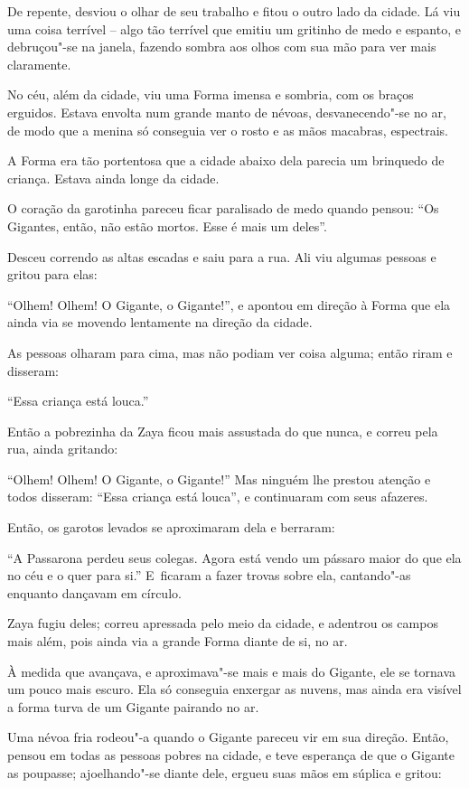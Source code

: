 De repente, desviou o olhar de seu trabalho e fitou o outro lado da
cidade. Lá viu uma coisa terrível -- algo tão terrível que emitiu um
gritinho de medo e espanto, e debruçou"-se na janela, fazendo sombra aos
olhos com sua mão para ver mais claramente.

No céu, além da cidade, viu uma Forma imensa e sombria, com os braços
erguidos. Estava envolta num grande manto de névoas,
desvanecendo"-se no ar, de modo que a menina só conseguia ver o rosto e as
mãos macabras, espectrais.

A Forma era tão portentosa que a cidade abaixo dela parecia um brinquedo
de criança. Estava ainda longe da cidade.

O coração da garotinha pareceu ficar paralisado de medo quando pensou:
``Os Gigantes, então, não estão mortos. Esse é mais um deles''.

Desceu correndo as altas escadas e saiu para a rua. Ali
viu algumas pessoas e gritou para elas:

``Olhem! Olhem! O Gigante, o Gigante!'', e apontou em direção à Forma
que ela ainda via se movendo lentamente na direção da cidade.

As pessoas olharam para cima, mas não podiam ver coisa alguma; então
riram e disseram:

``Essa criança está louca.''

Então a pobrezinha da Zaya ficou mais assustada do que nunca, e correu pela
rua, ainda gritando:

``Olhem! Olhem! O Gigante, o Gigante!'' Mas ninguém lhe prestou atenção
e todos disseram: ``Essa criança está louca'', e continuaram com seus
afazeres.

Então, os garotos levados se aproximaram dela e berraram:

``A Passarona perdeu seus colegas. Agora está vendo um pássaro maior do
que ela no céu e o quer para si.'' E~ficaram a fazer trovas sobre ela,
cantando"-as enquanto dançavam em círculo.

Zaya fugiu deles; correu apressada pelo meio da cidade, e adentrou os
campos mais além, pois ainda via a grande Forma diante de si, no ar.

À medida que avançava, e aproximava"-se mais e mais do Gigante, ele se
tornava um pouco mais escuro. Ela só conseguia enxergar as nuvens, mas ainda
era visível a forma turva de um Gigante pairando no ar.

Uma névoa fria rodeou"-a quando o Gigante pareceu vir em sua direção.
Então, pensou em todas as pessoas pobres na cidade, e teve esperança de
que o Gigante as poupasse; ajoelhando"-se diante dele, ergueu suas mãos
em súplica e gritou:

